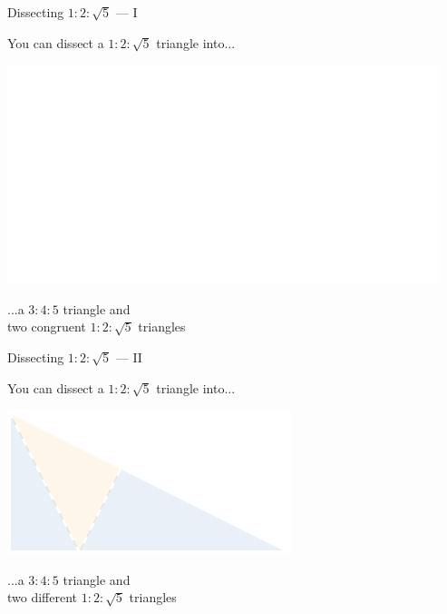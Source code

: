 \documentclass[14pt]{beamer}
\begin{document}

    \begin{frame}{Dissecting $1\!\!:\!\!2\!\!:\!\!\sqrt{5}$ --- I}
        \begin{center}
            You can dissect a $1\!\!:\!\!2\!\!:\!\!\sqrt{5}$ triangle into...

            \bigskip \bigskip

            \includegraphics[height=18ex]{figures/figure006e.pdf}

            \bigskip \bigskip

            ...a $3\!\!:\!\!4\!\!:\!\!5$ triangle and\\two congruent $1\!\!:\!\!2\!\!:\!\!\sqrt{5}$ triangles
        \end{center}
    \end{frame}


    \begin{frame}{Dissecting $1\!\!:\!\!2\!\!:\!\!\sqrt{5}$ --- II}
        \begin{center}
            You can dissect a $1\!\!:\!\!2\!\!:\!\!\sqrt{5}$ triangle into...

            \bigskip \bigskip

            \includegraphics[height=18ex]{figures/figure006i.pdf}

            \bigskip \bigskip

            ...a $3\!\!:\!\!4\!\!:\!\!5$ triangle and\\two different $1\!\!:\!\!2\!\!:\!\!\sqrt{5}$ triangles
        \end{center}
    \end{frame}
\end{document}
